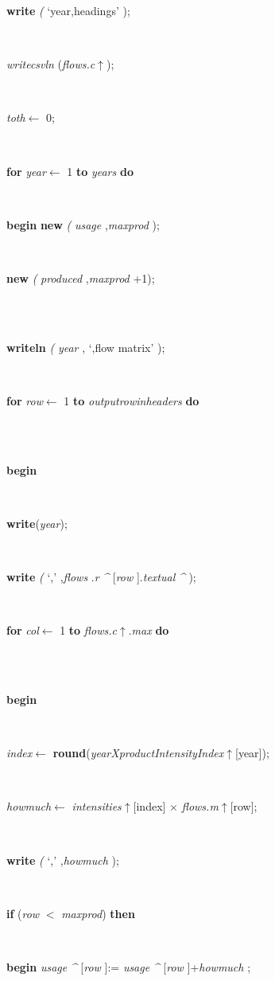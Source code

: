 \documentclass[10pt, a4paper]{article}
\begin{document}
\begin{tabbing}
\parbox{14cm}{\textsf{\textbf{write} \textit{(} \textrm{\textup { `year,headings' } });}}\\
\parbox{14cm}{\textsf{\textit{writecsvln} (\textit{flows.c}$\uparrow$\textit{})}; }\\
\parbox{14cm}{\textsf{\textit{toth}$\leftarrow$ 0}; }\\
\+\parbox{14cm}{\textsf {\textbf {for } \textsf{\textit{year}$\leftarrow$ 1} \textbf{ to } \textsf{\textit{years}} \textbf{ do } }}\\
\-\+\parbox{14cm}{\textsf{\textbf{begin}   \textbf{new} \textit{(} \textit{usage} ,\textit{maxprod} );}}\\
\parbox{14cm}{\textsf{\textbf{new} \textit{(} \textit{produced}  ,\textit{maxprod} +1);}}\\
\\
\parbox{14cm}{\textsf{\textbf{writeln} \textit{(} \textit{year} ,\textrm{\textup { `,flow matrix' } });}}\\
\+\parbox{14cm}{\textsf {\textbf {for } \textsf{\textit{row}$\leftarrow$ 1} \textbf{ to } \textsf{\textit{outputrowinheaders}} \textbf{ do } }}\\
\\
\<\parbox{14cm}{\textsf{\textbf{begin} }}\\
\parbox{14cm}{\textsf{\textbf{write}(\textit{year})}; }\\
\parbox{14cm}{\textsf{\textbf{write} \textit{(} \textrm{\textup { `,' } },\textit{flows} .\textit{r} \textit{\^{}} [\textit{row} ].\textit{textual} \textit{\^{}} );}}\\
\+\parbox{14cm}{\textsf {\textbf {for } \textsf{\textit{col}$\leftarrow$ 1} \textbf{ to } \textsf{\textit{flows.c}$\uparrow$.\textit{max}} \textbf{ do } }}\\
\\
\<\parbox{14cm}{\textsf{\textbf{begin} }}\\
\parbox{14cm}{\textsf{\textit{index}$\leftarrow$ \textbf{round}(\textit{yearXproductIntensityIndex}$\uparrow$\textit{}[year])}; }\\
\parbox{14cm}{\textsf{\textit{howmuch}$\leftarrow$ \textit{intensities}$\uparrow$\textit{}[index] $\times$ \textit{flows.m}$\uparrow$\textit{}[row]}; }\\
\parbox{14cm}{\textsf{\textbf{write} \textit{(} \textrm{\textup { `,' } },\textit{howmuch} );}}\\
\+\parbox{14cm}{\textsf {\textbf {if } \textsf{(\textit{row} $<$ \textit{maxprod})} \textbf{ then } }}\\
\-\+\parbox{14cm}{\textsf{\textbf{begin}  \textit{usage}  \textit{\^{}} [\textit{row} ]:= \textit{usage}  \textit{\^{}} [\textit{row} ]+\textit{howmuch}  ;}}\\

\end{tabbing}
\end{document}
